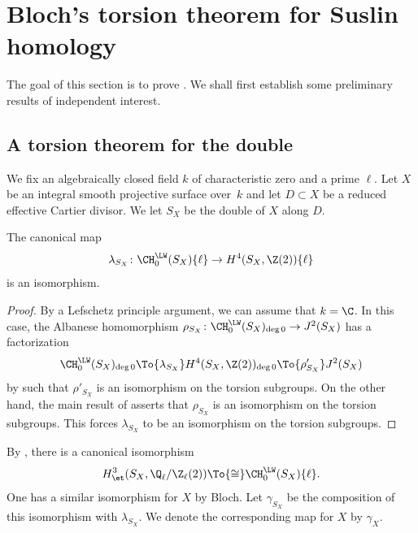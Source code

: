 \section{Bloch's torsion theorem for Suslin homology}
\label{sec:Suslin-tor}
The goal of this section is to prove .
We shall first establish some preliminary results of independent
interest.

\subsection{A torsion theorem for the double}
\label{sec:Sing-tor}
We fix an algebraically closed field $k$ of characteristic zero and a prime $\ell$.
Let $X$ be an integral smooth projective surface over~$k$ and let
$D \subset X$ be a reduced effective Cartier divisor. We let $S_X$ be the
double of $X$ along $D$.

\begin{lem}\label{lem:Double-0}
The canonical map
\[
\lambda_{S_X} \colon \CH^{\LW}_0(S_X)\{\ell\} \to H^4(S_X, \Z(2))\{\ell\}
\]
is an isomorphism.
\end{lem}
\begin{proof}
By a Lefschetz principle argument, we can assume that $k = \C$.
In this case, the Albanese homomorphism $\rho_{S_X} \colon
\CH^{\LW}_0(S_X)_{\deg 0} \to J^2(S_X)$ has a factorization
\[
\CH^{\LW}_0(S_X)_{\deg 0} \To{\lambda_{S_X}} H^4(S_X, \Z(2))_{\deg 0}
\To{\rho'_{S_X}} J^2(S_X)
\]
by \cite[Th.\,8.4]{KP} such that $\rho'_{S_X}$ is an isomorphism on the
torsion subgroups. On the other hand,
the main result of \cite{BPW} asserts that $\rho_{S_X}$ is an
isomorphism on the torsion subgroups. This forces $\lambda_{S_X}$ to be an
isomorphism on the torsion subgroups.
\end{proof}

By \cite[Th.\,3.6]{Krishna-2}, there is a canonical isomorphism
\[
H^3_\et(S_X, {\Q_\ell}/{\Z_\ell}(2)) \To{\cong} \CH^{\LW}_0(S_X)\{\ell\}.
\]
One has a similar isomorphism for $X$ by Bloch.
Let $\gamma_{S_X}$ be the composition of this isomorphism with $\lambda_{S_X}$.
We denote the corresponding map for $X$ by $\gamma_X$.

